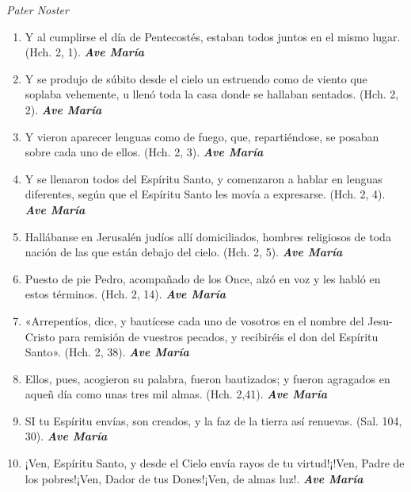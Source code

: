 \documentclass[a4paper,11pt, oneside]{report}
\begin{document}
{{      \medskip
      \textit{Pater Noster}

      \begin{enumerate}

        \item Y al cumplirse el día de Pentecostés, estaban todos juntos en el mismo lugar. (Hch. 2, 1). \textbf{\textit{Ave María}}

        \item Y se produjo de súbito desde el cielo un estruendo como de viento que soplaba vehemente, u llenó toda la casa
        donde se hallaban sentados. (Hch. 2, 2). \textbf{\textit{Ave María}}

        \item Y vieron aparecer lenguas como de fuego, que, repartiéndose, se posaban sobre cada uno de ellos. (Hch. 2, 3). \textbf{\textit{Ave María}}

        \item Y se llenaron todos del Espíritu Santo, y comenzaron a hablar en lenguas diferentes, según que el Espíritu Santo les movía
        a expresarse. (Hch. 2, 4). \textbf{\textit{Ave María}}

        \item Hallábanse en Jerusalén judíos allí domiciliados, hombres religiosos de toda nación de las que están debajo del cielo. (Hch. 2, 5). \textbf{\textit{Ave María}}

        \item Puesto de pie Pedro, acompañado de los Once, alzó en voz y les habló en estos términos. (Hch. 2, 14). \textbf{\textit{Ave María}}

        \item «Arrepentíos, dice, y bautícese cada uno de vosotros en el nombre del Jesu-Cristo para remisión de vuestros pecados, y recibiréis el don
        del Espíritu Santo». (Hch. 2, 38). \textbf{\textit{Ave María}}

        \item Ellos, pues, acogieron su palabra, fueron bautizados; y fueron agragados en aqueñ día como unas tres mil almas. (Hch. 2,41). \textbf{\textit{Ave María}}

        \item SI tu Espíritu envías, son creados, y la faz de la tierra así renuevas. (Sal. 104, 30). \textbf{\textit{Ave María}}

        \item ¡Ven, Espíritu Santo, y desde el Cielo envía rayos de tu virtud!¡!Ven, Padre de los pobres!¡Ven, Dador de tus Dones!¡Ven, de almas luz!. \textbf{\textit{Ave María}}
        

\end{enumerate}}}
\end{document}
